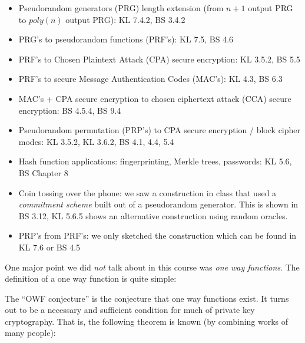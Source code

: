 \begin{itemize}
\tightlist
\item
  Pseudorandom generators (PRG) length extension (from \(n+1\) output
  PRG to \(poly(n)\) output PRG): KL 7.4.2, BS 3.4.2
\item
  PRG's to pseudorandom functions (PRF's): KL 7.5, BS 4.6
\item
  PRF's to Chosen Plaintext Attack (CPA) secure encryption: KL 3.5.2, BS
  5.5
\item
  PRF's to secure Message Authentication Codes (MAC's): KL 4.3, BS 6.3
\item
  MAC's + CPA secure encryption to chosen ciphertext attack (CCA) secure
  encryption: BS 4.5.4, BS 9.4
\item
  Pseudorandom permutation (PRP's) to CPA secure encryption / block
  cipher modes: KL 3.5.2, KL 3.6.2, BS 4.1, 4.4, 5.4
\item
  Hash function applications: fingerprinting, Merkle trees, passwords:
  KL 5.6, BS Chapter 8
\item
  Coin tossing over the phone: we saw a construction in class that used
  a \emph{commitment scheme} built out of a pseudorandom generator. This
  is shown in BS 3.12, KL 5.6.5 shows an alternative construction using
  random oracles.
\item
  PRP's from PRF's: we only sketched the construction which can be found
  in KL 7.6 or BS 4.5
\end{itemize}

One major point we did \emph{not} talk about in this course was
\emph{one way functions}. The definition of a one way function is quite
simple:

\hypertarget{owfdef}{}

The ``OWF conjecture'' is the conjecture that one way functions exist.
It turns out to be a necessary and sufficient condition for much of
private key cryptography. That is, the following theorem is known (by
combining works of many people):

